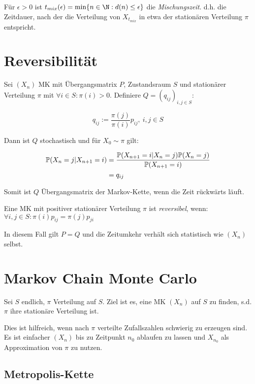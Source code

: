 Für $\epsilon > 0$ ist $t_{mix}(\epsilon) = \min\{ n \in \N : d(n) \leq \epsilon \}$ die \emph{Mischungszeit}. d.h. die Zeitdauer, nach der die Verteilung von $X_{t_{mix}}$ in etwa der stationären Verteilung $\pi$ entspricht.

\section*{Reversibilität}

Sei $(X_n)$ MK mit Übergangsmatrix $P$, Zustandsraum $S$ und stationärer Verteilung $\pi$ mit $\forall i \in S : \pi(i) > 0$. Definiere $Q = (q_{ij})_{i,j \in S}$:

\vspace*{-2mm}
$$q_{ij} := \frac{\pi(j)}{\pi(i)} p_{ij}, \ i,j \in S$$

Dann ist $Q$ stochastisch und für $X_0 \sim \pi$ gilt:

\vspace*{-4mm}
\begin{align*}
\P(X_n = j | X_{n+1} = i) &= \frac{\P(X_{n+1} = i | X_n = j) \P(X_n = j)}{\P(X_{n+1} = i)} \\
&= q_{ij}
\end{align*}

Somit ist $Q$ Übergangsmatrix der Markov-Kette, wenn die Zeit rückwärts läuft.

\vspace*{1mm}

Eine MK mit positiver stationärer Verteilung $\pi$ ist \emph{reversibel}, wenn: $\forall i, j \in S : \pi(i)p_{ij} = \pi(j)p_{ji}$

\vspace*{1mm}

In diesem Fall gilt $P=Q$ und die Zeitumkehr verhält sich statistisch wie $(X_n)$ selbst.

\section*{Markov Chain Monte Carlo}

Sei $S$ endlich, $\pi$ Verteilung auf $S$. Ziel ist es, eine MK $(X_n)$ auf $S$ zu finden, s.d. $\pi$ ihre stationäre Verteilung ist.

Dies ist hilfreich, wenn nach $\pi$ verteilte Zufallszahlen schwierig zu erzeugen sind. Es ist einfacher $(X_n)$ bis zu Zeitpunkt $n_0$ ablaufen zu lassen und $X_{n_0}$ als Approximation von $\pi$ zu nutzen.

\subsection*{Metropolis-Kette}

